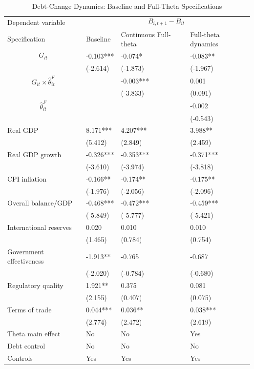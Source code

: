 \begin{table}[H]\centering
\begin{threeparttable}
\caption{Debt-Change Dynamics: Baseline and Full-Theta Specifications}
\label{tab:debt_change_combined_fulltheta}
\scriptsize
\begin{tabularx}{\textwidth}{lYYY}
\toprule
Dependent variable &  \\
\cmidrule(lr){2-4}
Specification & Baseline & Continuous Full-theta & Full-theta dynamics \\
\midrule
$$G_{it}$$ & -0.103*** & -0.074* & -0.083** \\
 & (-2.614) & (-1.873) & (-1.967) \\
$$G_{it}\times\widehat{\theta}^{F}_{it}$$ &  & -0.003*** & 0.001 \\
 &  & (-3.833) & (0.091) \\
$$\widehat{\theta}^{F}_{it}$$ &  &  & -0.002 \\
 &  &  & (-0.543) \\
Real GDP & 8.171*** & 4.207*** & 3.988** \\
 & (5.412) & (2.849) & (2.459) \\
Real GDP growth & -0.326*** & -0.353*** & -0.371*** \\
 & (-3.610) & (-3.974) & (-3.818) \\
CPI inflation & -0.166** & -0.174** & -0.175** \\
 & (-1.976) & (-2.056) & (-2.096) \\
Overall balance/GDP & -0.468*** & -0.472*** & -0.459*** \\
 & (-5.849) & (-5.777) & (-5.421) \\
International reserves & 0.020 & 0.010 & 0.010 \\
 & (1.465) & (0.784) & (0.754) \\
Government effectiveness & -1.913** & -0.765 & -0.687 \\
 & (-2.020) & (-0.784) & (-0.680) \\
Regulatory quality & 1.921** & 0.375 & 0.081 \\
 & (2.155) & (0.407) & (0.075) \\
Terms of trade & 0.044*** & 0.036** & 0.038*** \\
 & (2.774) & (2.472) & (2.619) \\
\midrule
Theta main effect & No & No & Yes \\
Debt control & No & No & No \\
Controls & Yes & Yes & Yes \\

\end{tabularx}
\end{threeparttable}
\end{table}
